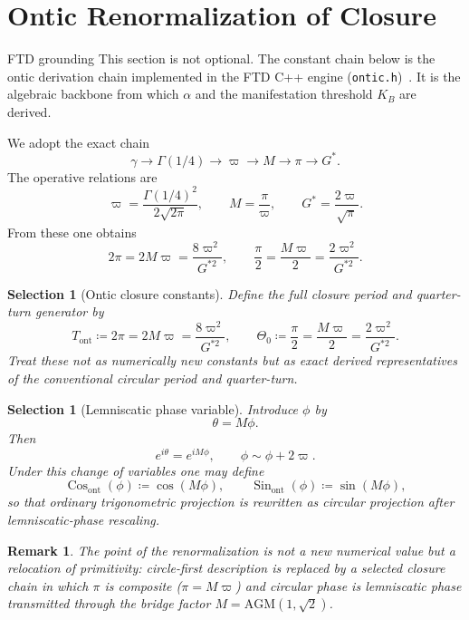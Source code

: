 \documentclass[11pt]{article}
\theoremstyle{tight}
\theoremstyle{plainroman}
\newtheorem{selection}[theorem]{Selection}
\newtheorem{remark}[theorem]{Remark}
\newcommand{\Tont}{T_{\mathrm{ont}}}
\newcommand{\Thetaont}{\Theta_{0}}
\newcommand{\Cosont}{\operatorname{Cos}_{\mathrm{ont}}}
\newcommand{\Sinont}{\operatorname{Sin}_{\mathrm{ont}}}
\begin{document}
\section{Ontic Renormalization of Closure}

\begin{cautionbox}{FTD grounding}
This section is not optional. The constant chain below is the ontic derivation chain implemented in the FTD C++ engine (\texttt{ontic.h})~\cite{ftdengine}.
It is the algebraic backbone from which $\alpha$ and the manifestation threshold $K_B$ are derived.
\end{cautionbox}

We adopt the exact chain
\[
\gamma \longrightarrow \Gamma(1/4) \longrightarrow \varpi \longrightarrow M \longrightarrow \pi \longrightarrow G^*.
\]
The operative relations are
\[
\varpi=\frac{\Gamma(1/4)^2}{2\sqrt{2\pi}},
\qquad
M=\frac{\pi}{\varpi},
\qquad
G^*=\frac{2\varpi}{\sqrt{\pi}}.
\]
From these one obtains
\[
2\pi=2M\varpi=\frac{8\varpi^2}{G^{*2}},
\qquad
\frac{\pi}{2}=\frac{M\varpi}{2}=\frac{2\varpi^2}{G^{*2}}.
\]
\begin{selection}[Ontic closure constants]
Define the full closure period and quarter-turn generator by
\[
\Tont \coloneqq 2\pi=2M\varpi=\frac{8\varpi^2}{G^{*2}},
\qquad
\Thetaont \coloneqq \frac{\pi}{2}=\frac{M\varpi}{2}=\frac{2\varpi^2}{G^{*2}}.
\]
Treat these not as numerically new constants but as exact derived representatives of the conventional circular period and quarter-turn.
\end{selection}
\begin{selection}[Lemniscatic phase variable]
Introduce $\phi$ by
\[
\theta=M\phi.
\]
Then
\[
e^{i\theta}=e^{iM\phi},
\qquad
\phi\sim \phi+2\varpi.
\]
Under this change of variables one may define
\[
\Cosont(\phi)\coloneqq \cos(M\phi),
\qquad
\Sinont(\phi)\coloneqq \sin(M\phi),
\]
so that ordinary trigonometric projection is rewritten as circular projection after lemniscatic-phase rescaling.
\end{selection}
\begin{remark}
The point of the renormalization is not a new numerical value but a relocation of primitivity: circle-first description is replaced by a selected closure chain in which $\pi$ is composite ($\pi=M\varpi$) and circular phase is lemniscatic phase transmitted through the bridge factor $M=\mathrm{AGM}(1,\sqrt{2})$.
\end{remark}
\end{document}
